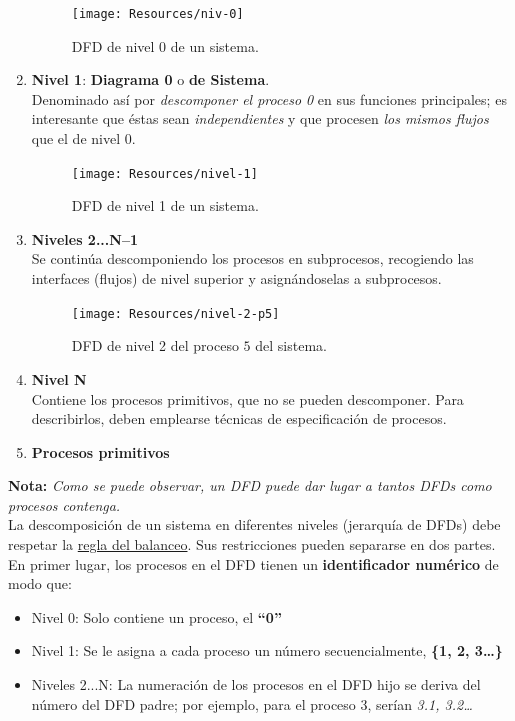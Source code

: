 \begin{enumerate}
          \begin{figure}[h!]
              \centering
              \texttt{[image: Resources/niv-0]}
              \caption{DFD de nivel 0 de un sistema.}
              \label{fig:dfdn0}
          \end{figure}
    \item \textbf{Nivel 1}: \textbf{Diagrama 0} o \textbf{de Sistema}.\\
          Denominado así por \textit{descomponer el proceso 0} en sus funciones principales; es interesante que éstas sean \textit{independientes} y que procesen \textit{los mismos flujos} que el de nivel 0.
          \begin{figure}[h!]
              \centering
              \texttt{[image: Resources/nivel-1]}
              \caption{DFD de nivel 1 de un sistema.}
              \label{fig:dfdn1}
          \end{figure}
    \item \textbf{Niveles 2...N--1}\\
          Se continúa descomponiendo los procesos en subprocesos, recogiendo las interfaces (flujos) de nivel superior y asignándoselas a subprocesos.
          \begin{figure}[h!]
              \centering
              \texttt{[image: Resources/nivel-2-p5]}
              \caption{DFD de nivel 2 del proceso $5$ del sistema.}
              \label{fig:dfdn2}
          \end{figure}
    \item \textbf{Nivel N}\\
          Contiene los procesos primitivos, que no se pueden descomponer. Para describirlos, deben emplearse técnicas de especificación de procesos.
    \item \textbf{Procesos primitivos}
\end{enumerate}

\textbf{Nota:} \textit{Como se puede observar, un DFD puede dar lugar a tantos DFDs como procesos contenga.}\\

La descomposición de un sistema en diferentes niveles (jerarquía de DFDs) debe respetar la \uline{regla del balanceo}. Sus restricciones pueden separarse en dos partes.\\

En primer lugar, los procesos en el DFD tienen un \textbf{identificador numérico} de modo que:
\begin{itemize}
    \item Nivel 0: Solo contiene un proceso, el \textbf{``0''}
    \item Nivel 1: Se le asigna a cada proceso un número secuencialmente, \textbf{\{1, 2, 3\ldots\}}
    \item Niveles 2...N: La numeración de los procesos en el DFD hijo se deriva del número del DFD padre; por ejemplo, para el proceso 3, serían \textit{3.1, 3.2\ldots}
\end{itemize}

